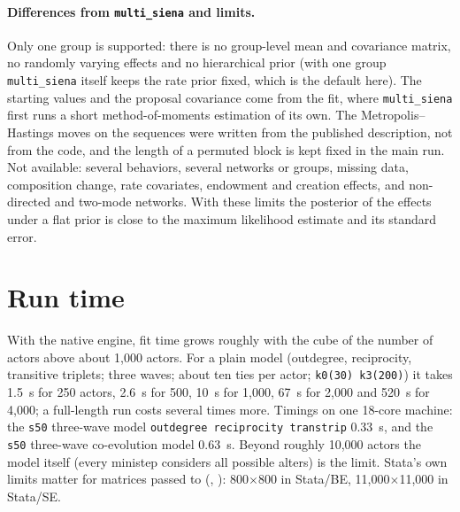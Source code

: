 \paragraph{Differences from \texttt{multi\_siena} and limits.} Only one group is supported: there is no group-level mean and covariance matrix, no randomly varying effects and no hierarchical prior (with one group \texttt{multi\_siena} itself keeps the rate prior fixed, which is the default here). The starting values and the proposal covariance come from the \nwsaom{} fit, where \texttt{multi\_siena} first runs a short method-of-moments estimation of its own. The Metropolis--Hastings moves on the sequences were written from the published description, not from the code, and the length of a permuted block is kept fixed in the main run. Not available: several behaviors, several networks or groups, missing data, composition change, rate covariates, endowment and creation effects, and non-directed and two-mode networks. With these limits the posterior of the effects under a flat prior is close to the maximum likelihood estimate and its standard error.

\section{Run time}
With the native engine, fit time grows roughly with the cube of the number of actors above about 1,000 actors. For a plain model (outdegree, reciprocity, transitive triplets; three waves; about ten ties per actor; \texttt{k0(30) k3(200)}) it takes 1.5~s for 250 actors, 2.6~s for 500, 10~s for 1,000, 67~s for 2,000 and 520~s for 4,000; a full-length run costs several times more. Timings on one 18-core machine: the \texttt{s50} three-wave model \texttt{outdegree reciprocity transtrip} 0.33~s, and the \texttt{s50} three-wave co-evolution model 0.63~s. Beyond roughly 10,000 actors the model itself (every ministep considers all possible alters) is the limit. Stata's own limits matter for matrices passed to \nwsaom{} (, ): 800$\times$800 in Stata/BE, 11,000$\times$11,000 in Stata/SE.
